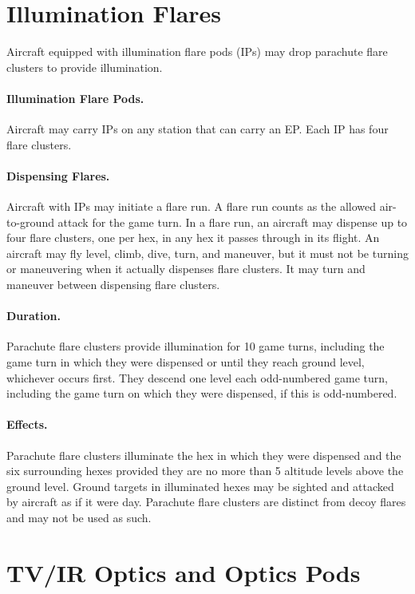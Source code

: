 \begin{advancedrules}
{}{

\section{Illumination Flares}
\label{rule:illumination-flares}

Aircraft equipped with illumination flare pods (IPs) may drop parachute flare clusters to provide illumination.

\paragraph{Illumination Flare Pods.} Aircraft may carry IPs on any station that can carry an EP. Each IP has four flare clusters.  

\paragraph{Dispensing Flares.} Aircraft with IPs may initiate a flare run. A flare run counts as the allowed air-to-ground attack for the game turn. In a flare run, an aircraft may dispense up to four flare clusters, one per hex, in any hex it passes through in its flight. An aircraft may fly level, climb, dive, turn, and maneuver, but it must not be turning or maneuvering when it actually dispenses flare clusters. It may turn and maneuver between dispensing flare clusters.

\paragraph{Duration.} Parachute flare clusters provide illumination for 10 game turns, including the game turn in which they were dispensed or until they reach ground level, whichever occurs first. They descend one level each odd-numbered game turn, including the game turn on which they were dispensed, if this is odd-numbered.

\paragraph{Effects.} 
Parachute flare clusters illuminate the hex in which they were dispensed and the six surrounding hexes provided they are no more than 5 altitude levels above the ground level. Ground targets in illuminated hexes may be sighted and attacked by aircraft as if it were day. Parachute flare clusters are distinct from decoy flares and may not be used as such.

\section{TV/IR Optics and Optics Pods}
\label{rule:tv-ir-optics}

}
\end{advancedrules}

